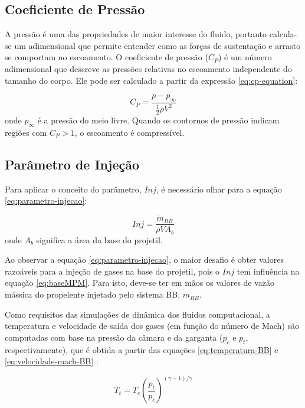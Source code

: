 \subsection{Coeficiente de Pressão}

A pressão é uma das propriedades de maior interesse do fluido, portanto calcula-se um adimensional que permite entender como as forças de sustentação e arrasto se comportam no escoamento. O coeficiente de pressão ($C_{P}$) é um número adimensional que descreve as pressões relativas no escoamento independente do tamanho do corpo. Ele pode ser calculado a partir da expressão \eqref{eq:cp-equation}: 

\begin{equation}\label{eq:cp-equation}
    C_P = \frac{p - p_{\infty}}{\frac{1}{2}\rho V^2}
\end{equation}
%
onde $p_{\infty}$ é a pressão do meio livre. Quando os contornos de pressão indicam regiões com $C_{P} > 1$, o escoamento é compressível.

\subsection{Parâmetro de Injeção}

Para aplicar o conceito do parâmetro, $Inj$, é necessário olhar para a equação \ref{eq:parametro-injecao}:

\begin{equation}\label{eq:parametro-injecao}
    Inj = \frac{\Dot{m}_{BB}}{\rho VA_{b}}
\end{equation}
%
onde $A_{b}$ significa a área da base do projetil. 

Ao observar a equação \ref{eq:parametro-injecao}, o maior desafio é obter valores razoáveis para a injeção de gases na base do projetil, pois o $Inj$ tem influência na equação \ref{eq:baseMPM}. Para isto, deve-se ter em mãos os valores de vazão mássica do propelente injetado pelo sistema BB, $\Dot{m}_{BB}$. 

Como requisitos das simulações de dinâmica dos fluidos computacional, a temperatura e velocidade de saída dos gases (em função do número de Mach) são computadas com base na pressão da câmara e da garganta (\(p_{c}\) e \(p_{t}\), respectivamente), que é obtida a partir das equações \ref{eq:temperatura-BB} e \ref{eq:velocidade-mach-BB} \cite{Gil2020}:

\begin{equation}
    \label{eq:temperatura-BB}
    T_{t} = T_{c}\left(\frac{p_t}{p_c}\right)^{(\gamma - 1)/\gamma}
\end{equation}

